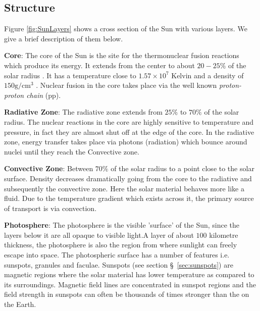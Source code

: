 \subsection{Structure}

Figure \ref{fig:SunLayers} shows a cross section of the Sun with various layers. We give a brief description 
of them below.

\textbf{Core}: The core of the Sun is the site for the thermonuclear fusion reactions which produce its energy. 
It extends from the center to about $20-25\%$ of the solar radius \citep{SolarAct}. It has a temperature close to 
$1.57 \times 10^7$ Kelvin and a density of $150 \text{g}/\text{cm}^3$ \citep{SolarCore}. Nuclear fusion in the core 
takes place via the well known \emph{proton-proton chain} (pp).

\textbf{Radiative Zone}: The radiative zone extends from $25\%$ to $70\%$ of the solar radius. The nuclear reactions 
in the core are highly sensitive to temperature and pressure, in fact they are almost shut off at the edge of the core. 
In the radiative zone, energy transfer takes place via photons (radiation) which bounce around nuclei until 
they reach the Convective zone.

\textbf{Convective Zone}: Between $70\%$ of the solar radius to a point close to the solar surface. Density decreases 
dramatically going from the core to the radiative and subsequently the convective zone. Here the solar material behaves more 
like a fluid. Due to the temperature gradient which exists across it, the primary source of transport is 
via convection.

\textbf{Photosphere}: The photosphere is the visible 'surface' of the Sun, since the layers below it are all opaque to 
visible light.A layer of about $100$ kilometre thickness, the photosphere is also the region from where sunlight can freely 
escape into space. The photospheric surface has a number of features i.e. sunspots, granules and faculae. 
Sunspots (see section \S~\ref{sec:sunspots}) are magnetic regions where the solar material has lower temperature as compared 
to its surroundings. Magnetic field lines are concentrated in sunspot regions and the field strength in sunspots can often 
be thousands of times stronger than the on the Earth.



